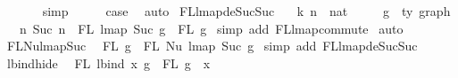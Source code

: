 \begin{isabellebody}
\ \ \ \ \ \isamarkupfalse%
\ simp\isanewline
\ \ \isamarkupfalse%
\ \isamarkupfalse%
\ {\isacharquery}{\kern0pt}case\ \isakeywordONE{{\isachardot}{\kern0pt}}\isamarkupfalse%
\isanewline
{}\isamarkupfalse%
\ auto%
\endisatagproof
{\isafoldproof}%
%
\isadelimproof
\isanewline
%
\endisadelimproof
\isanewline
\isanewline
{}\isamarkupfalse%
\ FL{\isacharunderscore}{\kern0pt}lmap{\isacharunderscore}{\kern0pt}deSuc{\isacharunderscore}{\kern0pt}Suc{\isacharcolon}{\kern0pt}\isanewline
\ \ \ k\ n\ {\isacharcolon}{\kern0pt}{\isacharcolon}{\kern0pt}\ nat\isanewline
\ \ \ \ \ g\ {\isacharcolon}{\kern0pt}{\isacharcolon}{\kern0pt}\ {\isachardoublequoteopen}{\isacharprime}{\kern0pt}ty\ graph{\isachardoublequoteclose}\isanewline
\ \ \ {\isachardoublequoteopen}{\isacharbraceleft}{\kern0pt}n{\isachardot}{\kern0pt}\ Suc\ n\ {\isasymin}\ FL\ {\isacharparenleft}{\kern0pt}lmap\ Suc\ g{\isacharparenright}{\kern0pt}{\isacharbraceright}{\kern0pt}\ {\isacharequal}{\kern0pt}\ FL\ g{\isachardoublequoteclose}\isanewline
%
\isadelimproof
%
\endisadelimproof
%
\isatagproof
{}\isamarkupfalse%
\ {\isacharparenleft}{\kern0pt}simp\ add{\isacharcolon}{\kern0pt}\ FL{\isacharunderscore}{\kern0pt}lmap{\isacharunderscore}{\kern0pt}commute{\isacharparenright}{\kern0pt}\isanewline
{}\isamarkupfalse%
\ auto%
\endisatagproof
{\isafoldproof}%
%
\isadelimproof
\isanewline
%
\endisadelimproof
\isanewline
\isanewline
{}\isamarkupfalse%
\ FL{\isacharunderscore}{\kern0pt}Nu{\isacharunderscore}{\kern0pt}lmap{\isacharunderscore}{\kern0pt}Suc{\isacharcolon}{\kern0pt}\isanewline
\ \ {\isachardoublequoteopen}FL\ g\ {\isacharequal}{\kern0pt}\ FL\ {\isacharparenleft}{\kern0pt}Nu\ {\isacharparenleft}{\kern0pt}lmap\ Suc\ g{\isacharparenright}{\kern0pt}{\isacharparenright}{\kern0pt}{\isachardoublequoteclose}\isanewline
%
\isadelimproof
%
\endisadelimproof
%
\isatagproof
{}\isamarkupfalse%
\ {\isacharparenleft}{\kern0pt}simp\ add{\isacharcolon}{\kern0pt}\ FL{\isacharunderscore}{\kern0pt}lmap{\isacharunderscore}{\kern0pt}deSuc{\isacharunderscore}{\kern0pt}Suc{\isacharparenright}{\kern0pt}%
\endisatagproof
{\isafoldproof}%
%
\isadelimproof
\isanewline
%
\endisadelimproof
\isanewline
\isanewline
{}\isamarkupfalse%
\ lbind{\isacharunderscore}{\kern0pt}hide{\isacharcolon}{\kern0pt}\isanewline
\ \ {\isachardoublequoteopen}FL\ {\isacharparenleft}{\kern0pt}lbind\ x\ g{\isacharparenright}{\kern0pt}\ {\isacharequal}{\kern0pt}\ FL\ g\ {\isacharminus}{\kern0pt}\ {\isacharbraceleft}{\kern0pt}x{\isacharbraceright}{\kern0pt}{\isachardoublequoteclose}\isanewline

\end{isabellebody}
